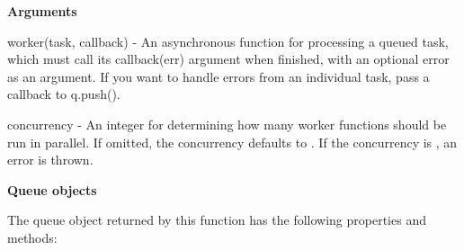 {\bfseries Arguments}


\begin{DoxyItemize}
\item {\ttfamily worker(task, callback)} -\/ An asynchronous function for processing a queued task, which must call its {\ttfamily callback(err)} argument when finished, with an optional {\ttfamily error} as an argument. If you want to handle errors from an individual task, pass a callback to {\ttfamily q.\+push()}.
\item {\ttfamily concurrency} -\/ An {\ttfamily integer} for determining how many {\ttfamily worker} functions should be run in parallel. If omitted, the concurrency defaults to {}. If the concurrency is {}, an error is thrown.
\end{DoxyItemize}

{\bfseries Queue objects}

The {\ttfamily queue} object returned by this function has the following properties and methods\+:


